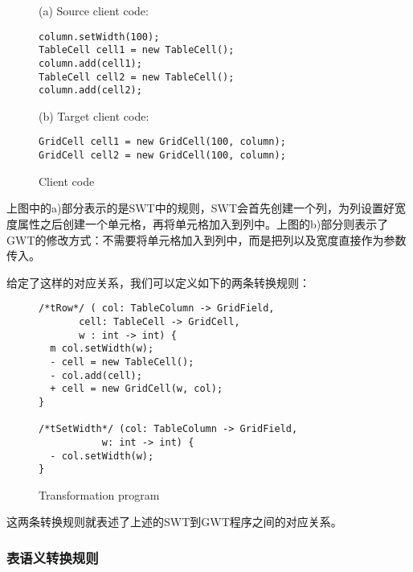 \begin{figure}[ht]
\begin{center}
\begin{smpage}{0.5\columnwidth}
  {\small (a) Source client code:}
\begin{lstlisting}[style=java]
column.setWidth(100);
TableCell cell1 = new TableCell();
column.add(cell1);
TableCell cell2 = new TableCell();
column.add(cell2);
\end{lstlisting}

  {\small (b) Target client code:}
\begin{lstlisting}[style=java]
GridCell cell1 = new GridCell(100, column);
GridCell cell2 = new GridCell(100, column);
\end{lstlisting}
\end{smpage}
\end{center}
\caption{Client code}
\label{fig:client}
\end{figure}

上图中的a)部分表示的是SWT中的规则，SWT会首先创建一个列，为列设置好宽度属性之后创建一个单元格，再将单元格加入到列中。上图的b)部分则表示了GWT的修改方式：不需要将单元格加入到列中，而是把列以及宽度直接作为参数传入。

给定了这样的对应关系，我们可以定义如下的两条转换规则：

\begin{figure}[ht]
\begin{center}
\begin{smpage}{0.5\columnwidth}
\begin{lstlisting}[style=patl]
/*tRow*/ ( col: TableColumn -> GridField,
       cell: TableCell -> GridCell,
       w : int -> int) {
  m col.setWidth(w);
  - cell = new TableCell();
  - col.add(cell);
  + cell = new GridCell(w, col);
}

/*tSetWidth*/ (col: TableColumn -> GridField,
           w: int -> int) {
  - col.setWidth(w);
}
\end{lstlisting}
\end{smpage}
\end{center}
\caption{Transformation program}
\label{fig:transform}
\end{figure}

这两条转换规则就表述了上述的SWT到GWT程序之间的对应关系。

\subsubsection{表语义转换规则}

